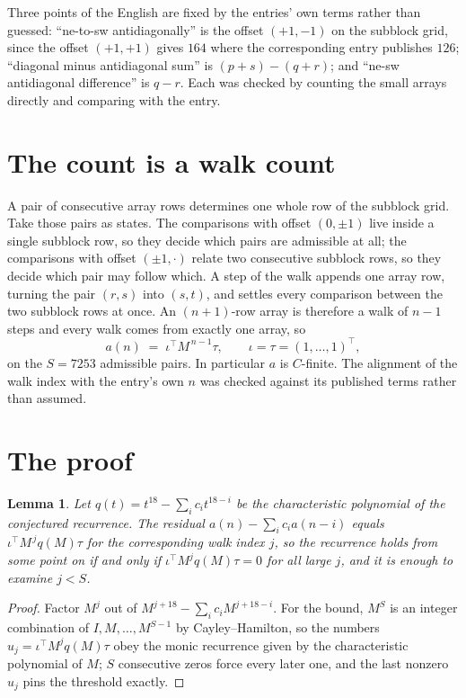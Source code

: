 \documentclass[11pt,a4paper]{article}
\theoremstyle{plain}
\newtheorem{lemma}[theorem]{Lemma}
\theoremstyle{definition}
\begin{document}
Three points of the English are fixed by the entries' own terms rather than guessed:
``ne-to-sw antidiagonally'' is the offset $(+1,-1)$ on the subblock grid, since the offset
$(+1,+1)$ gives $164$ where the corresponding entry publishes $126$; ``diagonal minus
antidiagonal sum'' is $(p+s)-(q+r)$; and ``ne-sw antidiagonal difference'' is $q-r$. Each was
checked by counting the small arrays directly and comparing with the entry.

\section{The count is a walk count}

A pair of consecutive array rows determines one whole row of the subblock grid. Take those
pairs as states. The comparisons with offset $(0,\pm1)$ live inside a single subblock row, so
they decide which pairs are admissible at all; the comparisons with offset $(\pm1,\cdot)$
relate two consecutive subblock rows, so they decide which pair may follow which. A step of the
walk appends one array row, turning the pair $(r,s)$ into $(s,t)$, and settles every comparison
between the two subblock rows at once. An $(n+1)$-row array is therefore a walk of $n-1$ steps
and every walk comes from exactly one array, so
\[
a(n)\;=\;\iota^{\!\top}M^{\,n-1}\tau,\qquad \iota=\tau=(1,\dots,1)^{\!\top},
\]
on the $S=7253$ admissible pairs. In particular $a$ is $C$-finite. The alignment of the walk
index with the entry's own $n$ was checked against its published terms rather than assumed.

\section{The proof}

\begin{lemma}\label{lem:crit}
Let $q(t)=t^{18}-\sum_i c_it^{18-i}$ be the characteristic polynomial of the
conjectured recurrence. The residual $a(n)-\sum_ic_ia(n-i)$ equals
$\iota^{\!\top}M^{\,j}q(M)\tau$ for the corresponding walk index $j$, so the recurrence
holds from some point on if and only if $\iota^{\!\top}M^{j}q(M)\tau=0$ for all large $j$,
and it is enough to examine $j<S$.
\end{lemma}

\begin{proof}
Factor $M^{j}$ out of $M^{j+18}-\sum_ic_iM^{j+18-i}$. For the bound, $M^{S}$
is an integer combination of $I,M,\dots,M^{S-1}$ by Cayley--Hamilton, so the numbers
$u_j=\iota^{\!\top}M^{j}q(M)\tau$ obey the monic recurrence given by the characteristic
polynomial of $M$; $S$ consecutive zeros force every later one, and the last nonzero $u_j$
pins the threshold exactly.
\end{proof}
\end{document}
